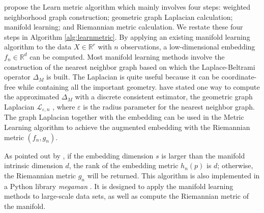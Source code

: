 \documentclass[11pt,a4paper,]{article}
\begin{document}
\textcite{Perrault-Joncas2013-pq} propose the Learn metric algorithm which mainly
involves four steps: weighted neighborhood graph construction; geometric
graph Laplacian calculation; manifold learning; and Riemannian metric
calculation. We restate these four steps in Algorithm
\ref{alg:learnmetric}. By applying an existing manifold learning
algorithm to the data \(X\in \mathbb{R}^r\) with \(n\) observations, a
low-dimensional embedding \(f_n \in \mathbb{R}^d\) can be computed. Most
manifold learning methods involve the construction of the nearest
neighbor graph based on which the Laplace-Beltrami operator \(\Delta_M\)
is built. The Laplacian is quite useful because it can be
coordinate-free while containing all the important geometry.
\textcite{Perrault-Joncas2013-pq} have stated one way to compute the approximated
\(\Delta_M\) with a discrete consistent estimator, the geometric graph
Laplacian \(\mathcal{L}_{\varepsilon,n}\) \autocite{Zhou2011-za}, where
\(\varepsilon\) is the radius parameter for the nearest neighbor graph.
The graph Laplacian together with the embedding can be used in the
Metric Learning algorithm to achieve the augmented embedding with the
Riemannian metric \((f_n, g_n)\).

As pointed out by \textcite{Perrault-Joncas2013-pq}, if the embedding dimension
\(s\) is larger than the manifold intrinsic dimension \(d\), the rank of the
embedding metric \(h_n(p)\) is \(d\); otherwise, the Riemannian metric \(g_n\)
will be returned. This algorithm is also implemented in a Python library
\emph{megaman} \autocite{McQueen2016-xz}. It is designed to apply the manifold
learning methods to large-scale data sets, as well as compute the
Riemannian metric of the manifold.
\end{document}
